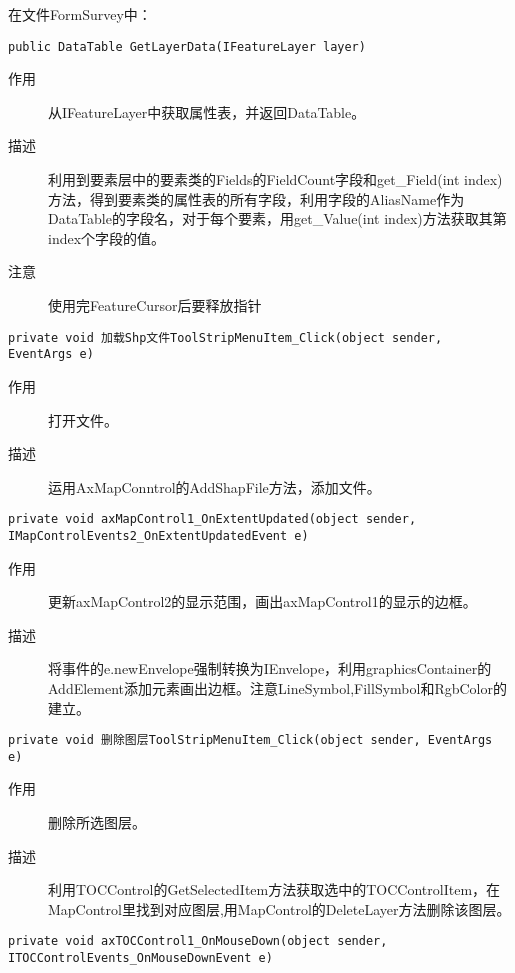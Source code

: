 \documentclass[twoside,color=blue,mathpazo,titlestyle=hang,12pt]{elegantbook}
\numberwithin{equation}{section}
\begin{document}
在文件FormSurvey中：
\begin{lstlisting}
public DataTable GetLayerData(IFeatureLayer layer)
\end{lstlisting}
\begin{description}
\item[作用] 从IFeatureLayer中获取属性表，并返回DataTable。
\item[描述] 利用到要素层中的要素类的Fields的FieldCount字段和get\_Field(int index)方法，得到要素类的属性表的所有字段，利用字段的AliasName作为DataTable的字段名，对于每个要素，用get\_Value(int index)方法获取其第index个字段的值。
\item[注意] 使用完FeatureCursor后要释放指针
\end{description}
\begin{lstlisting}
private void 加载Shp文件ToolStripMenuItem_Click(object sender, EventArgs e)
\end{lstlisting}
\begin{description}
\item[作用] 打开文件。
\item[描述] 运用AxMapConntrol的AddShapFile方法，添加文件。
\end{description}
\begin{lstlisting}
private void axMapControl1_OnExtentUpdated(object sender, IMapControlEvents2_OnExtentUpdatedEvent e)
\end{lstlisting}
\begin{description}
\item[作用] 更新axMapControl2的显示范围，画出axMapControl1的显示的边框。
\item[描述] 将事件的e.newEnvelope强制转换为IEnvelope，利用graphicsContainer的AddElement添加元素画出边框。注意LineSymbol,FillSymbol和RgbColor的建立。
\end{description}
\begin{lstlisting}
private void 删除图层ToolStripMenuItem_Click(object sender, EventArgs e)
\end{lstlisting}
\begin{description}
\item[作用] 删除所选图层。
\item[描述] 利用TOCControl的GetSelectedItem方法获取选中的TOCControlItem，在MapControl里找到对应图层,用MapControl的DeleteLayer方法删除该图层。
\end{description}
\begin{lstlisting}
private void axTOCControl1_OnMouseDown(object sender, ITOCControlEvents_OnMouseDownEvent e)
\end{lstlisting}
\end{document}
